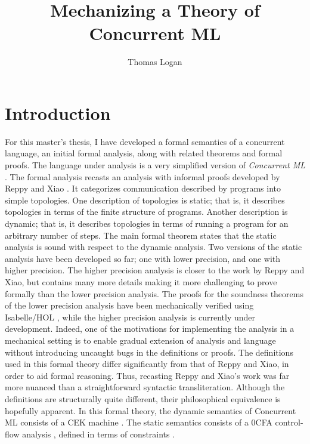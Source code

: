 \documentclass[letterpaper, 11pt]{extarticle}
\title{Mechanizing a Theory of Concurrent ML}
\author{Thomas Logan}
\begin{document}
\maketitle
{}

\newpage
{}

\section{Introduction}
For this master's thesis, I have developed a formal semantics of
a concurrent language, an initial formal analysis, along with related theorems and formal 
proofs. The language under analysis is
a very simplified version of \textit{Concurrent ML} \cite{reppy2007concurrent}. The formal analysis
recasts an analysis with informal proofs developed by Reppy and Xiao \cite{reppy2007specialization}. It
categorizes communication described by programs into simple topologies. One description of
topologies is static; that is, it describes topologies in terms of the finite structure of
programs.  Another description is dynamic; that is, it describes topologies in terms of running
a program for an arbitrary number of steps. The main formal theorem states that the static
analysis is sound with respect to the dynamic analysis. Two versions of the static analysis
have been developed so far; one with lower precision, and one with higher precision. The higher
precision analysis is closer to the work by Reppy and Xiao, but contains many more details making
it more challenging to prove formally than the lower precision analysis.
The proofs for the soundness theorems of the lower precision analysis
have been mechanically verified using Isabelle/HOL \cite{nipkow2002isabelle}, while the higher precision
analysis is currently under development. Indeed, one of the motivations for implementing the analysis 
in a mechanical setting is to enable gradual extension of analysis and language without introducing
uncaught bugs in the definitions or proofs. The definitions used in this formal theory differ
significantly from that of Reppy and Xiao, in order to aid formal reasoning. Thus, recasting
Reppy and Xiao's work was far more nuanced than a straightforward
syntactic transliteration.
Although the definitions are structurally quite different,
their philosophical equivalence is hopefully apparent. 
In this formal theory, the dynamic semantics of Concurrent ML consists of 
a CEK machine \cite{felleisen1986control}. The static semantics consists of a 0CFA control-flow analysis
\cite{shivers1991control}, defined in terms of constraints \cite{nielson2015principles}.
\end{document}
